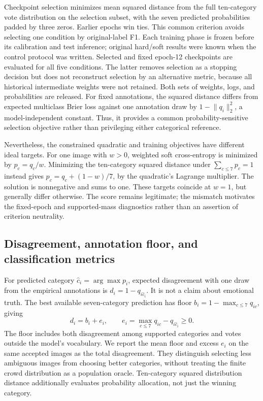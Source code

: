 \documentclass[pdflatex,sn-mathphys-num]{sn-jnl}
\begin{document}
Checkpoint selection minimizes mean squared distance from the full ten-category vote distribution on the selection subset, with the seven predicted probabilities padded by three zeros. Earlier epochs win ties. This common criterion avoids selecting one condition by original-label F1. Each training phase is frozen before its calibration and test inference; original hard/soft results were known when the control protocol was written. Selected and fixed epoch-12 checkpoints are evaluated for all five conditions. The latter removes selection as a stopping decision but does not reconstruct selection by an alternative metric, because all historical intermediate weights were not retained. Both sets of weights, logs, and probabilities are released.
For fixed annotations, the squared distance differs from expected multiclass Brier loss against one annotation draw by $1-\lVert q_i\rVert_2^2$, a model-independent constant. Thus, it provides a common probability-sensitive selection objective rather than privileging either categorical reference.

Nevertheless, the constrained quadratic and training objectives have different ideal targets. For one image with $w>0$, weighted soft cross-entropy is minimized by $p_c=q_c/w$. Minimizing the ten-category squared distance under $\sum_{c\leq7}p_c=1$ instead gives $p_c=q_c+(1-w)/7$, by the quadratic's Lagrange multiplier. The solution is nonnegative and sums to one. These targets coincide at $w=1$, but generally differ otherwise. The score remains legitimate; the mismatch motivates the fixed-epoch and supported-mass diagnostics rather than an assertion of criterion neutrality.

\subsection{Disagreement, annotation floor, and classification metrics}
For predicted category $\hat c_i=\arg\max p_i$, expected disagreement with one draw from the empirical annotations is $d_i=1-q_{i\hat c_i}$. It is not a claim about emotional truth. The best available seven-category prediction has floor $b_i=1-\max_{c\leq7}q_{ic}$, giving
\begin{equation}
d_i=b_i+e_i,\qquad e_i=\max_{c\leq7}q_{ic}-q_{i\hat c_i}\geq0.
\label{eq:decomposition}
\end{equation}
The floor includes both disagreement among supported categories and votes outside the model's vocabulary. We report the mean floor and excess $e_i$ on the same accepted images as the total disagreement. They distinguish selecting less ambiguous images from choosing better categories, without treating the finite crowd distribution as a population oracle. Ten-category squared distribution distance additionally evaluates probability allocation, not just the winning category.
\end{document}
